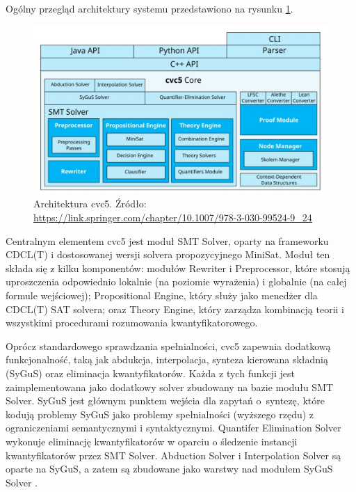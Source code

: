 Ogólny przegląd architektury systemu przedstawiono na rysunku \ref{fig:cvc5}.

\begin{figure}[htbp]
	\centering
	\begin{minipage}{\textwidth}
		\includegraphics[width=\textwidth]{./figures/cvc5_architecture}
		\caption{Architektura cvc5. Źródło: \url{https://link.springer.com/chapter/10.1007/978-3-030-99524-9_24}}
		\label{fig:cvc5}
	\end{minipage}
\end{figure}

Centralnym elementem cvc5 jest moduł SMT Solver, oparty na frameworku CDCL(T) \cite{NieuwenhuisOT06} i dostosowanej wersji solvera propozycyjnego MiniSat. Moduł ten składa się z kilku komponentów: modułów Rewriter i Preprocessor, które stosują uproszczenia odpowiednio lokalnie (na poziomie wyrażenia) i globalnie (na całej formule wejściowej); Propositional Engine, który służy jako menedżer dla CDCL(T) SAT solvera; oraz Theory Engine, który zarządza kombinacją teorii i wszystkimi procedurami rozumowania kwantyfikatorowego.

Oprócz standardowego sprawdzania spełnialności, cvc5 zapewnia dodatkową funkcjonalność, taką jak abdukcja, interpolacja, synteza kierowana składnią (SyGuS) oraz eliminacja kwantyfikatorów. Każda z tych funkcji jest zaimplementowana jako dodatkowy solver zbudowany na bazie modułu SMT Solver. SyGuS jest głównym punktem wejścia
dla zapytań o~syntezę, które kodują problemy SyGuS jako problemy spełnialności (wyższego rzędu) z ograniczeniami semantycznymi i syntaktycznymi. Quantifer Elimination Solver wykonuje eliminację kwantyfikatorów w oparciu o śledzenie instancji kwantyfikatorów przez SMT Solver. Abduction Solver i Interpolation Solver są oparte na SyGuS, a zatem są zbudowane jako warstwy nad modułem SyGuS Solver \cite{BarbosaBBKLMMMN22}.

